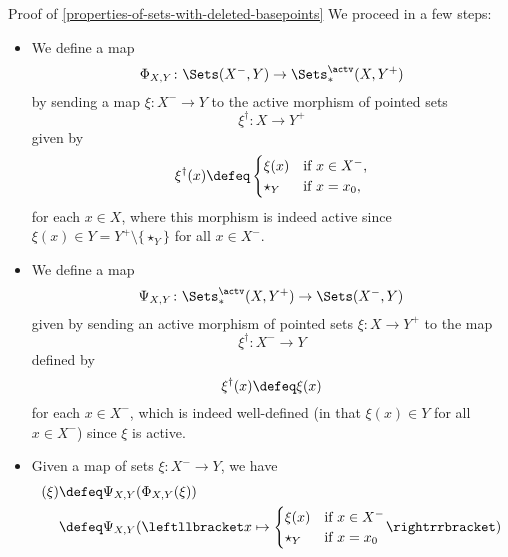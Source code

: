\begin{Proof}{Proof of \cref{properties-of-sets-with-deleted-basepoints}}
    We proceed in a few steps:
    \begin{itemize}
        \item{}We define a map
            \[
                \Phi_{X,Y}%
                \colon%
                \Sets(X^{-},Y)%
                \to%
                \Sets^{\actv}_{*}(X,Y^{+})%
            \]%
            by sending a map $\xi\colon X^{-}\to Y$ to the active morphism of pointed sets%
            \[
                \xi^{\dagger}%
                \colon%
                X%
                \to%
                Y^{+}%
            \]%
            given by
            \[
                \xi^{\dagger}(x)%
                \defeq
                \begin{cases}
                    \xi(x)    &\text{if $x\in X^{-}$,}\\
                    \star_{Y} &\text{if $x=x_{0}$,}
                \end{cases}
            \]%
            for each $x\in X$, where this morphism is indeed active since $\xi(x)\in Y=Y^{+}\setminus\{\star_{Y}\}$ for all $x\in X^{-}$.
        \item{}We define a map
            \[
                \Psi_{X,Y}%
                \colon%
                \Sets^{\actv}_{*}(X,Y^{+})%
                \to%
                \Sets(X^{-},Y)%
            \]%
            given by sending an active morphism of pointed sets $\xi\colon X\to Y^{+}$ to the map
            \[
                \xi^{\dagger}%
                \colon%
                X^{-}%
                \to%
                Y%
            \]%
            defined by
            \[
                \xi^{\dagger}(x)%
                \defeq%
                \xi(x)
            \]%
            for each $x\in X^{-}$, which is indeed well-defined (in that $\xi(x)\in Y$ for all $x\in X^{-}$) since $\xi$ is active.
        \item{}Given a map of sets $\xi\colon X^{-}\to Y$, we have
            \begin{align*}
                [\Psi_{X,Y}\circ\Phi_{X,Y}](\xi) &\defeq \Psi_{X,Y}(\Phi_{X,Y}(\xi))\\%
                                                 &\defeq \Psi_{X,Y}(\leftllbracket x\mapsto{\begin{cases}\xi(x)&\text{if $x\in X^{-}$}\\\star_{Y}&\text{if $x=x_{0}$}\end{cases}}\rightrrbracket)\\%

\end{align*}
\end{itemize}
\end{Proof}

